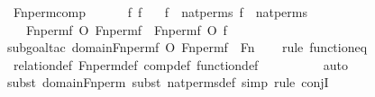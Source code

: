 \begin{isabellebody}
\isamarkupfalse%
\ Fn{\isacharunderscore}{\kern0pt}perm{\isacharprime}{\kern0pt}{\isacharunderscore}{\kern0pt}comp\ {\isacharcolon}{\kern0pt}\ \ \isanewline
\ \ \ f\ f{\isacharprime}{\kern0pt}\isanewline
\ \ \ {\isachardoublequoteopen}f\ {\isasymin}\ nat{\isacharunderscore}{\kern0pt}perms{\isachardoublequoteclose}\ {\isachardoublequoteopen}f{\isacharprime}{\kern0pt}\ {\isasymin}\ nat{\isacharunderscore}{\kern0pt}perms{\isachardoublequoteclose}\ \isanewline
\ \ \ {\isachardoublequoteopen}Fn{\isacharunderscore}{\kern0pt}perm{\isacharprime}{\kern0pt}{\isacharparenleft}{\kern0pt}f{\isacharparenright}{\kern0pt}\ O\ Fn{\isacharunderscore}{\kern0pt}perm{\isacharprime}{\kern0pt}{\isacharparenleft}{\kern0pt}f{\isacharprime}{\kern0pt}{\isacharparenright}{\kern0pt}\ {\isacharequal}{\kern0pt}\ Fn{\isacharunderscore}{\kern0pt}perm{\isacharprime}{\kern0pt}{\isacharparenleft}{\kern0pt}f\ O\ f{\isacharprime}{\kern0pt}{\isacharparenright}{\kern0pt}{\isachardoublequoteclose}\ \isanewline
%
\isadelimproof
\ \ %
\endisadelimproof
%
\isatagproof
{}\isamarkupfalse%
{\isacharparenleft}{\kern0pt}subgoal{\isacharunderscore}{\kern0pt}tac\ {\isachardoublequoteopen}domain{\isacharparenleft}{\kern0pt}Fn{\isacharunderscore}{\kern0pt}perm{\isacharprime}{\kern0pt}{\isacharparenleft}{\kern0pt}f{\isacharparenright}{\kern0pt}\ O\ Fn{\isacharunderscore}{\kern0pt}perm{\isacharprime}{\kern0pt}{\isacharparenleft}{\kern0pt}f{\isacharprime}{\kern0pt}{\isacharparenright}{\kern0pt}{\isacharparenright}{\kern0pt}\ {\isacharequal}{\kern0pt}\ Fn{\isachardoublequoteclose}{\isacharparenright}{\kern0pt}\isanewline
\ \ \ \isamarkupfalse%
{\isacharparenleft}{\kern0pt}rule\ function{\isacharunderscore}{\kern0pt}eq{\isacharparenright}{\kern0pt}\isanewline
\ \ \isamarkupfalse%
\ relation{\isacharunderscore}{\kern0pt}def\ Fn{\isacharunderscore}{\kern0pt}perm{\isacharprime}{\kern0pt}{\isacharunderscore}{\kern0pt}def\ comp{\isacharunderscore}{\kern0pt}def\ function{\isacharunderscore}{\kern0pt}def\isanewline
\ \ \ \ \ \ \ \ \isamarkupfalse%
\ auto{\isacharbrackleft}{\kern0pt}{}{\isacharbrackright}{\kern0pt}\isanewline
\ \ \ \ \isamarkupfalse%
{\isacharparenleft}{\kern0pt}subst\ domain{\isacharunderscore}{\kern0pt}Fn{\isacharunderscore}{\kern0pt}perm{\isacharprime}{\kern0pt}{\isacharcomma}{\kern0pt}\ subst\ nat{\isacharunderscore}{\kern0pt}perms{\isacharunderscore}{\kern0pt}def{\isacharcomma}{\kern0pt}\ simp{\isacharcomma}{\kern0pt}\ rule\ conjI{\isacharparenright}{\kern0pt}\isanewline

\end{isabellebody}
